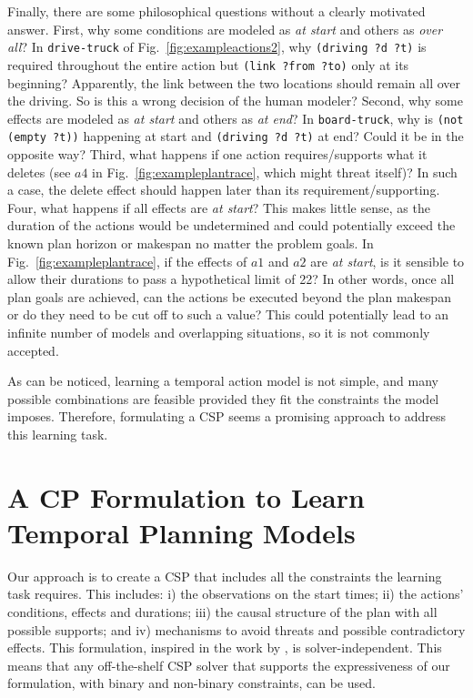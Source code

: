 \documentclass[runningheads]{llncs}
\begin{document}
Finally, there are some philosophical questions without a clearly motivated answer. First, why some conditions are modeled as \emph{at start} and others as \emph{over all}? In \texttt{drive-truck} of Fig.~\ref{fig:exampleactions2}, why \texttt{(driving ?d ?t)} is required throughout the entire action but \texttt{(link ?from ?to)} only at its beginning? Apparently, the link between the two locations should remain all over the driving. So is this a wrong decision of the human modeler?
Second, why some effects are modeled as \emph{at start} and others as \emph{at end}? In \texttt{board-truck}, why is \texttt{(not (empty ?t))} happening at start and \texttt{(driving ?d ?t)} at end? Could it be in the opposite way?
Third, what happens if one action requires/supports what it deletes (see $a4$ in Fig.~\ref{fig:exampleplantrace}, which might threat itself)? In such a case, the delete effect should happen later than its requirement/supporting.
Four, what happens if all effects are \emph{at start}? This makes little sense, as the duration of the actions would be undetermined and could potentially exceed the known plan horizon or makespan no matter the problem goals. In Fig.~\ref{fig:exampleplantrace}, if the effects of $a1$ and $a2$ are \emph{at start}, is it sensible to allow their durations to pass a hypothetical limit of 22? In other words, once all plan goals are achieved, can the actions be executed beyond the plan makespan or do they need to be cut off to such a value? This could potentially lead to an infinite number of models and overlapping situations, so it is not commonly accepted.

As can be noticed, learning a temporal action model is not simple, and many possible combinations are feasible provided they fit the constraints the model imposes. Therefore, formulating a CSP seems a promising approach to address this learning task.



\section{A CP Formulation to Learn Temporal Planning Models}
\label{sec:CPformulation}

Our approach is to create a CSP that includes all the constraints the learning task requires. This includes: i) the observations on the start times; ii) the actions' conditions, effects and durations; iii) the causal structure of the plan with all possible supports; and iv) mechanisms to avoid threats and possible contradictory effects. This formulation, inspired in the work by \cite{garrido2009constraint}, is solver-independent. This means that any off-the-shelf CSP solver that supports the expressiveness of our formulation, with binary and non-binary constraints, can be used.
\end{document}
